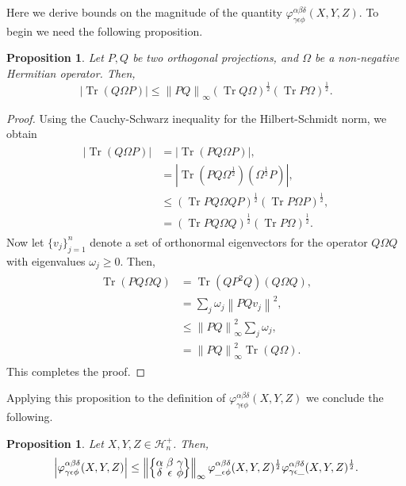 \documentclass[notitlepage, 11pt, letterpaper]{amsart}
\theoremstyle{plain}
\newtheorem{prop}[thm]{Proposition}
\theoremstyle{definition}
\DeclareMathOperator{\Tr}{Tr}
\newcommand{\norm}[1]{\left\lVert#1\right\rVert}
\newcommand{\abs}[1]{\left|#1\right|}
\newcommand{\hermp}[1]{\mathcal H^{+}_{#1}}
\newcommand{\vp}{\varphi} %
\newcommand{\ya}{\alpha}
\newcommand{\yb}{\beta}
\newcommand{\yc}{\gamma}
\newcommand{\yd}{\delta}
\newcommand{\ye}{\epsilon}
\newcommand{\yf}{\phi}
\newcommand{\tightcurlysixj}[1]{
\begingroup
\arraycolsep=1.5pt
\renewcommand{\arraystretch}{0.3}
\left\{\!\begin{array}{ccc}
    #1
\end{array}\!\right\}
\endgroup
}
\newcommand{\abcdefsymbol}{\tightcurlysixj{\alpha & \beta & \gamma \\ \delta & \epsilon & \phi}}
\begin{document}
Here we derive bounds on the magnitude of the quantity $\vp^{\ya \yb \yd}_{\yc \ye \yf}(X, Y, Z)$.
To begin we need the following proposition.
\begin{prop}\label{prop:cauchy_schwarz_ineq_double_proj}
    Let $P, Q$ be two orthogonal projections, and $\Omega$ be a non-negative Hermitian operator.
    Then,
    \begin{equation}
        \label{eq:cauchy_schwarz_ineq_double_proj}
        \abs{\Tr(Q \Omega P)} \leq \norm{PQ}_{\infty} (\Tr Q\Omega)^{\frac{1}{2}}(\Tr P\Omega )^{\frac{1}{2}}.
    \end{equation}
\end{prop}
\begin{proof}
    Using the Cauchy-Schwarz inequality for the Hilbert-Schmidt norm, we obtain
    \begin{align}
        \begin{split}
            \abs{\Tr(Q \Omega P)}
            &= \abs{\Tr(P Q \Omega P)}, \\
            &= \abs{\Tr(P Q \Omega^{\frac{1}{2}}) (\Omega^{\frac{1}{2}} P)}, \\
            &\leq (\Tr P Q \Omega Q P)^{\frac{1}{2}} (\Tr P \Omega P)^{\frac{1}{2}}, \\
            &= (\Tr P Q \Omega Q)^{\frac{1}{2}} (\Tr P \Omega)^{\frac{1}{2}}.
        \end{split}
    \end{align}
    Now let $\{ v_j \}_{j=1}^{n}$ denote a set of orthonormal eigenvectors for the operator $Q \Omega Q$ with eigenvalues $\omega_j \geq 0$.
    Then,
    \begin{align}
        \begin{split}
            \Tr(P Q \Omega Q)
            &= \Tr (Q P^2 Q)(Q \Omega Q), \\
            &= \sum_j \omega_j \norm{P Q v_j}^2, \\
            &\leq \norm{P Q}_\infty^2  \sum_{j} \omega_j, \\
            &= \norm{P Q}_\infty^2 \Tr(Q \Omega).
        \end{split}
    \end{align}
    This completes the proof.
\end{proof}
Applying this proposition to the definition of $\vp^{\ya\yb\yd}_{\yc\ye\yf}(X,Y,Z)$ we conclude the following.
\begin{prop}
    \label{prop:varphi_tet_main_ineq}
    Let $X,Y,Z \in \hermp{n}$. Then,
    \begin{equation}
        \abs{\vp^{\ya\yb\yd}_{\yc\ye\yf}(X,Y,Z)} \leq \norm{\abcdefsymbol}_{\infty} \vp^{\ya\yb\yd}_{\_\ye\yf}(X,Y,Z)^{\frac{1}{2}} \vp^{\ya\yb\yd}_{\yc\ye\_}(X,Y,Z)^{\frac{1}{2}}.
    \end{equation}
\end{prop}
\end{document}
